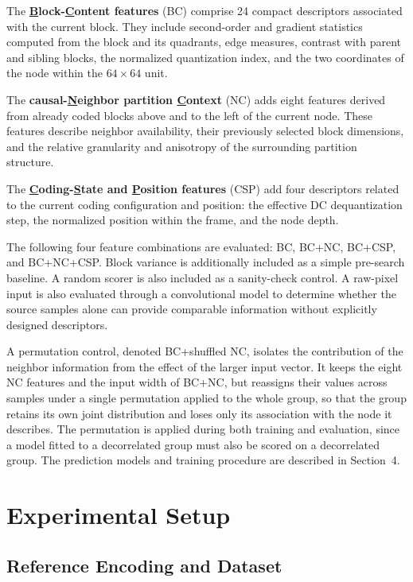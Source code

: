 \documentclass{article}
\begin{document}
The \textbf{\underline{B}lock-\underline{C}ontent features} (BC) comprise 24 compact descriptors associated with the current block. They include second-order and gradient statistics computed from the block and its quadrants, edge measures, contrast with parent and sibling blocks, the normalized quantization index, and the two coordinates of the node within the $64\times64$ unit.

The \textbf{causal-\underline{N}eighbor partition \underline{C}ontext} (NC) adds eight features derived from already coded blocks above and to the left of the current node. These features describe neighbor availability, their previously selected block dimensions, and the relative granularity and anisotropy of the surrounding partition structure.

The \textbf{\underline{C}oding-\underline{S}tate and \underline{P}osition features} (CSP) add four descriptors related to the current coding configuration and position: the effective DC dequantization step, the normalized position within the frame, and the node depth.

The following four feature combinations are evaluated: BC, BC+NC, BC+CSP, and BC+NC+CSP. Block variance is additionally included as a simple pre-search baseline. A random scorer is also included as a sanity-check control. A raw-pixel input is also evaluated through a convolutional model to determine whether the source samples alone can provide comparable information without explicitly designed descriptors.

A permutation control, denoted BC+shuffled NC, isolates the contribution of the neighbor information from the effect of the larger input vector. It keeps the eight NC features and the input width of BC+NC, but reassigns their values across samples under a single permutation applied to the whole group, so that the group retains its own joint distribution and loses only its association with the node it describes. The permutation is applied during both training and evaluation, since a model fitted to a decorrelated group must also be scored on a decorrelated group. The prediction models and training procedure are described in Section~4.

\section{Experimental Setup}

\subsection{Reference Encoding and Dataset}
\end{document}
